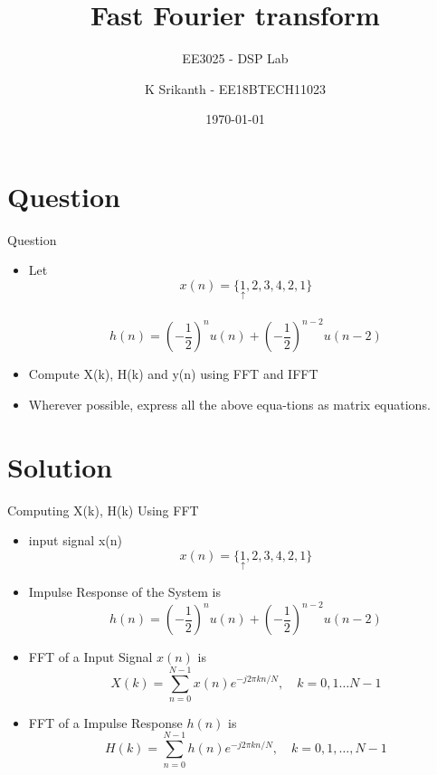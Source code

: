 \documentclass[english,10pt]{beamer}
\title[EE3025 - DSP Lab ]{Fast Fourier transform}
\subtitle{EE3025 - DSP Lab }
\author[K Srikanth]{K Srikanth - EE18BTECH11023}
\institute[IITH]{Indian Institute of Technology Hyderabad}
\date{\today}
\begin{document}
{\selectfont
\begin{frame}
 \maketitle
 
\end{frame}



\section{Question} 
\begin{frame}{Question}
\begin{itemize}
        \item Let \[ x(n) = \{\underset{\uparrow}{1},2,3,4,2,1 \} \]\\
            \[ h(n)=\left(-\frac{1}{2}\right)^{n} u(n)+\left(-\frac{1}{2}\right)^{n-2} u(n-2)\]
        \item Compute X(k), H(k) and y(n) using FFT and IFFT 
        \item Wherever possible, express all the above equa-tions as matrix equations.
\end{itemize}

\end{frame}

\section{Solution }
\begin{frame}{Computing X(k), H(k) Using  FFT   }
 
\begin{itemize}
\item input signal x(n)
    \[ x(n) = \{ \underset{\uparrow}{1},2,3,4,2,1 \}\]
    \item Impulse Response of the System is
    \[h(n)=\left(-\frac{1}{2}\right)^{n} u(n)+\left(-\frac{1}{2}\right)^{n-2} u(n-2)\]
    \item FFT of a Input Signal $x(n)$ is 
     \[  X(k) = \sum_{n=0}^{N-1} x(n) e^{-j 2 \pi k n / N}, \quad k=0,1 \ldots N-1\]
    \item FFT of a Impulse Response $h(n)$ is 
    \[  H(k) = \sum_{n=0}^{N-1} h(n) e^{-j 2 \pi k n / N}, \quad k=0,1, \ldots, N-1\]
\end{itemize}


\end{frame}}
\end{document}
